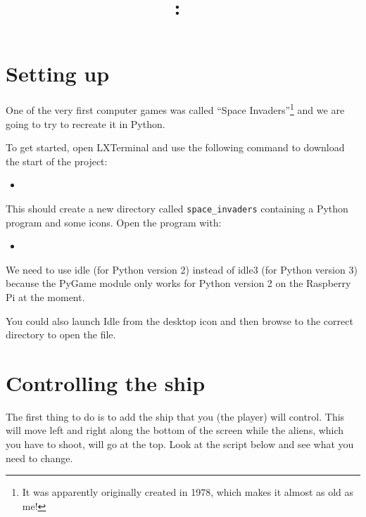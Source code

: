 \documentclass{article}
\title{
\vspace{2in}
\textmd{\textbf{\hmwkClass:\ \hmwkTitle}}\\
\vspace{3in}
}
\date{} %
\newcommand{\bashscript}[2]{
\begin{itemize}
\item[]
\end{itemize}
}
\newenvironment{hint}{
  \begin{tcolorbox}[colback=green!5,colframe=green!40!black,title=Note]}
{\end{tcolorbox}}
\begin{document}
\maketitle



\newpage


\section{Setting up}

One of the very first computer games was called ``Space Invaders''\footnote{It
was apparently originally created in 1978, which makes it almost as old as me!}
and we are going to try to recreate it in Python.

To get started, open LXTerminal and use the following command to download the
start of the project:

\bashscript{setup}{Get the the starting point}

This should create a new directory called \texttt{space\_invaders} containing
a Python program and some icons. Open the program with:

\bashscript{openscript}{Opening the starting point}

\begin{hint}
We need to use idle (for Python version 2) instead of idle3 (for Python
version 3) because the PyGame module only works for Python version 2 on the
Raspberry Pi at the moment.

You could also launch Idle from the desktop icon and then browse to the
correct directory to open the file.
\end{hint}

\section{Controlling the ship}

The first thing to do is to add the ship that you (the player) will control.
This will move left and right along the bottom of the screen while the aliens,
which you have to shoot, will go at the top. Look at the script below and see
what you need to change.
\end{document}
